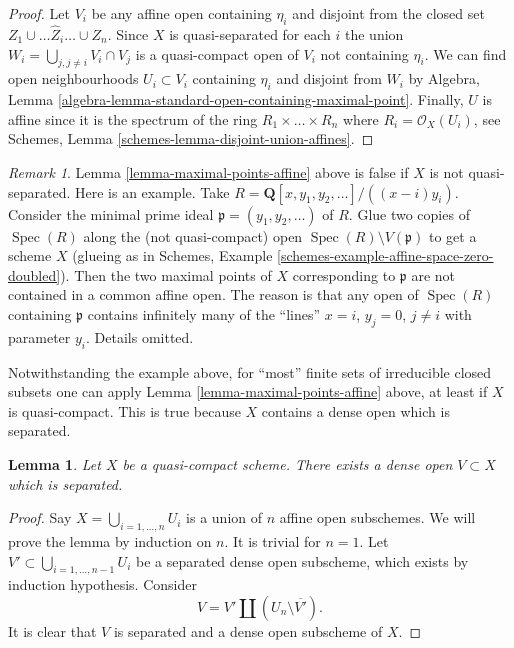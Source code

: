 \documentclass{stacks-project}
\theoremstyle{plain}
\newtheorem{lemma}[subsection]{Lemma}
\theoremstyle{definition}
\theoremstyle{remark}
\newtheorem{remark}[subsection]{Remark}
\numberwithin{equation}{subsection}
\def\Spec{\mathop{\mathrm{Spec}}}
\begin{document}
\begin{proof}
Let $V_i$ be any affine open containing $\eta_i$
and disjoint from the closed set $Z_1 \cup \ldots \hat Z_i \ldots \cup Z_n$.
Since $X$ is quasi-separated for each $i$ the union
$W_i = \bigcup_{j, j \not = i} V_i \cap V_j$ is a quasi-compact
open of $V_i$ not containing $\eta_i$.
We can find open neighbourhoods $U_i \subset V_i$
containing $\eta_i$ and disjoint from $W_i$ by
Algebra, Lemma \ref{algebra-lemma-standard-open-containing-maximal-point}.
Finally, $U$ is affine since it is the spectrum of
the ring $R_1 \times \ldots \times R_n$ where $R_i = \mathcal{O}_X(U_i)$,
see Schemes, Lemma \ref{schemes-lemma-disjoint-union-affines}.
\end{proof}

\begin{remark}
\label{remark-maximal-points-affine}
Lemma \ref{lemma-maximal-points-affine} above is false if $X$
is not quasi-separated. Here is an example. Take
$R = \mathbf{Q}[x, y_1, y_2, \ldots]/((x-i)y_i)$.
Consider the minimal prime ideal $\mathfrak p = (y_1, y_2, \ldots)$
of $R$. Glue two copies of $\Spec(R)$ along the
(not quasi-compact) open $\Spec(R) \setminus V(\mathfrak p)$
to get a scheme $X$ (glueing as in
Schemes, Example \ref{schemes-example-affine-space-zero-doubled}).
Then the two maximal points of $X$ corresponding to $\mathfrak p$
are not contained in a common affine open. The reason is
that any open of $\Spec(R)$ containing $\mathfrak p$
contains infinitely many of the ``lines'' $x = i$, $y_j = 0$,
$j \not = i$ with parameter $y_i$. Details omitted.
\end{remark}

\noindent
Notwithstanding the example above, for ``most'' finite sets of irreducible
closed subsets one can apply Lemma \ref{lemma-maximal-points-affine} above,
at least if $X$ is quasi-compact. This is true because $X$ contains a dense
open which is separated.

\begin{lemma}
\label{lemma-quasi-compact-dense-open-separated}
Let $X$ be a quasi-compact scheme.
There exists a dense open $V \subset X$ which is separated.
\end{lemma}

\begin{proof}
Say $X = \bigcup_{i = 1, \ldots, n} U_i$ is a union of $n$ affine open
subschemes. We will prove the lemma by induction on $n$. It is trivial for
$n = 1$. Let $V' \subset \bigcup_{i = 1, \ldots, n - 1} U_i$ be a separated
dense open subscheme, which exists by induction hypothesis. Consider
$$
V = V' \amalg (U_n \setminus \overline{V'}).
$$
It is clear that $V$ is separated and a dense open subscheme of $X$.
\end{proof}
\end{document}
